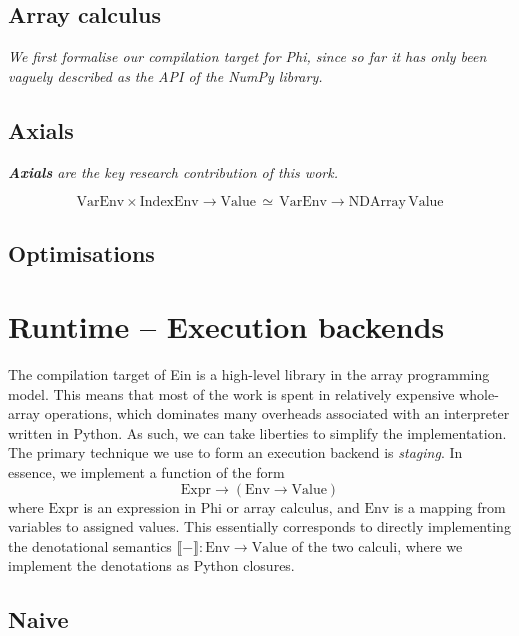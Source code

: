 \subsection{Array calculus}

\textit{We first formalise our compilation target for Phi, since so far it has only been vaguely described as the API of the NumPy library.} \todothis

\subsection{Axials}

\textit{\textbf{Axials} are the key research contribution of this work.}

$$ \mathrm{VarEnv} \times \mathrm{IndexEnv} \to \mathrm{Value} \,\simeq\, \mathrm{VarEnv} \to \mathrm{NDArray}\, \mathrm{Value} $$

\todothis


\subsection{Optimisations}

\todothis

\section{Runtime -- Execution backends}

The compilation target of Ein is a high-level library in the array programming model. This means that most of the work is spent in relatively expensive whole-array operations, which dominates many overheads associated with an interpreter written in Python. As such, we can take liberties to simplify the implementation. The primary technique we use to form an execution backend is \textit{staging}. In essence, we implement a function of the form
$$ \mathrm{Expr} \to \left( \mathrm{Env} \to \mathrm{Value} \right) $$
where $\mathrm{Expr}$ is an expression in Phi or array calculus, and $\mathrm{Env}$ is a mapping from variables to assigned values. This essentially corresponds to directly implementing the denotational semantics $\llbracket - \rrbracket : \mathrm{Env} \to \mathrm{Value}$ of the two calculi, where we implement the denotations as Python closures.

\subsection{Naive}

